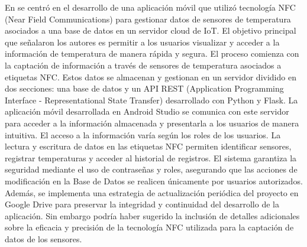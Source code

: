 \bigbreak
En \cite{jaramillo_diseno_2020} se centró en el desarrollo de una aplicación móvil que utilizó tecnología NFC (Near Field Communications) para gestionar datos de sensores de temperatura asociados a una base de datos en un servidor cloud de IoT. El objetivo principal que señalaron los autores es permitir a los usuarios visualizar y acceder a la información de temperatura de manera rápida y segura. El proceso comienza con la captación de información a través de sensores de temperatura asociados a etiquetas NFC. Estos datos se almacenan y gestionan en un servidor dividido en dos secciones: una base de datos y un API REST (Application Programming Interface - Representational State Transfer) desarrollado con Python y Flask. La aplicación móvil desarrollada en Android Studio se comunica con este servidor para acceder a la información almacenada y presentarla a los usuarios de manera intuitiva. El acceso a la información varía según los roles de los usuarios. La lectura y escritura de datos en las etiquetas NFC permiten identificar sensores, registrar temperaturas y acceder al historial de registros. El sistema garantiza la seguridad mediante el uso de contraseñas y roles, asegurando que las acciones de modificación en la Base de Datos se realicen únicamente por usuarios autorizados. Además, se implementa una estrategia de actualización periódica del proyecto en Google Drive para preservar la integridad y continuidad del desarrollo de la aplicación. Sin embargo podría haber sugerido la inclusión de detalles adicionales sobre la eficacia y precisión de la tecnología NFC utilizada para la captación de datos de los sensores.

